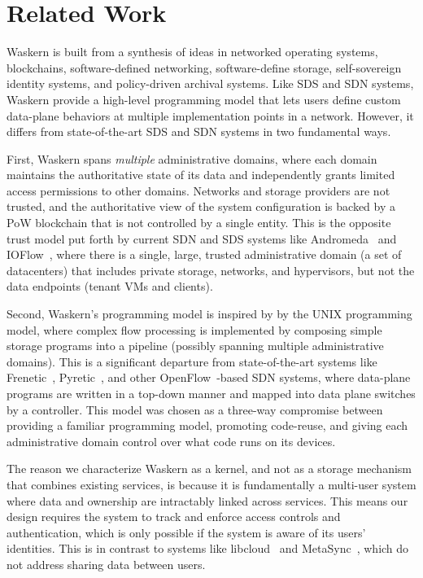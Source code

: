 \section{Related Work}
\label{sec:related-work}

Waskern is built from a synthesis of ideas in networked operating systems, blockchains,
software-defined networking, software-define storage, self-sovereign
identity systems, and policy-driven archival systems.  Like SDS and SDN
systems, Waskern provide a high-level programming model that lets users
define custom data-plane behaviors at multiple implementation points in a
network.  However, it differs from
state-of-the-art SDS and SDN systems in two fundamental ways.

First, Waskern spans \textit{multiple} administrative domains,
where each domain maintains the authoritative state
of its data and independently grants limited access permissions to 
other domains.  Networks and storage providers are not trusted, and the
authoritative view of the system configuration is backed by a PoW blockchain that is not
controlled by a single entity.  This is the
opposite trust model put forth by current SDN and SDS systems like
Andromeda~\cite{andromeda} and IOFlow~\cite{ioflow},
where there is a single, large, trusted administrative domain (a set of datacenters)
that includes private storage,
networks, and hypervisors, but not the data endpoints (tenant VMs and clients).

Second, Waskern's programming model is inspired by
by the UNIX programming model, where complex flow processing is implemented by
composing simple storage programs into a pipeline (possibly spanning multiple
administrative domains).
This is a significant departure from state-of-the-art systems
like Frenetic~\cite{frenetic}, Pyretic~\cite{pyretic}, and other
OpenFlow~\cite{openflow}-based SDN systems, where data-plane programs are written in a top-down
manner and mapped into data plane switches by a controller.  This model was chosen
as a three-way compromise between providing a familiar programming model, promoting code-reuse,
and giving each administrative domain control over what code runs on
its devices.

The reason we characterize Waskern as a kernel, and not as a storage mechanism
that combines existing services, is because it is fundamentally a multi-user system where
data and ownership are intractably linked across services.
This means our design requires the system to track and enforce access controls
and authentication, which is only possible if the system is aware of its users'
identities.  This is in contrast to systems like libcloud~\cite{libcloud} and
MetaSync~\cite{metasync}, which do not address sharing data between users.

